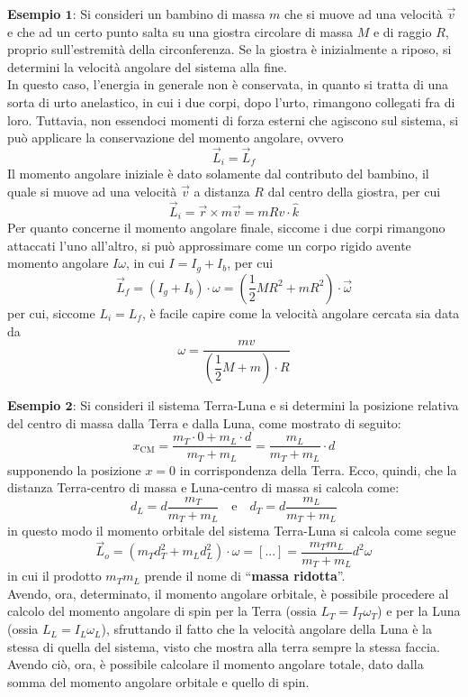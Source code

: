 \documentclass[a4paper]{extarticle}
\newcommand{\quotes}[1]{``#1''}
\begin{document}
\vspace{1em}
\noindent
\textbf{Esempio $\boldsymbol{1}$}: Si consideri un bambino di massa $m$ che si muove ad una velocità $\vec v$ e che ad un certo punto salta su una giostra circolare di massa $M$ e di raggio $R$, proprio sull'estremità della circonferenza. Se la giostra è inizialmente a riposo, si determini la velocità angolare del sistema alla fine.\\
In questo caso, l'energia in generale non è conservata, in quanto si tratta di una sorta di urto anelastico, in cui i due corpi, dopo l'urto, rimangono collegati fra di loro. Tuttavia, non essendoci momenti di forza esterni che agiscono sul sistema, si può applicare la conservazione del momento angolare, ovvero
\[\vec L_i = \vec L_f\]
Il momento angolare iniziale è dato solamente dal contributo del bambino, il quale si muove ad una velocità $\vec v$ a distanza $R$ dal centro della giostra, per cui
\[\vec L_i = \vec r \times m \vec v = m R v \cdot \hat{k}\]
Per quanto concerne il momento angolare finale, siccome i due corpi rimangono attaccati l'uno all'altro, si può approssimare come un corpo rigido avente momento angolare $I \omega$, in cui $I=I_g+I_b$, per cui
\[\vec L_f = (I_g + I_b) \cdot \omega = \left(\frac{1}{2}MR^2 + mR^2\right) \cdot \vec \omega\]
per cui, siccome $L_i=L_f$, è facile capire come la velocità angolare cercata sia data da
\[\omega = \frac{mv}{\left(\dfrac{1}{2}M + m\right) \cdot R}\]

\vspace{1em}
\noindent
\textbf{Esempio $\boldsymbol{2}$}: Si consideri il sistema Terra-Luna e si determini la posizione relativa del centro di massa dalla Terra e dalla Luna, come mostrato di seguito:
\[x_{\text{CM}} = \frac{m_T \cdot 0 + m_L \cdot d}{m_T + m_L} = \frac{m_L}{m_T + m_L} \cdot d\]
supponendo la posizione $x=0$ in corrispondenza della Terra. Ecco, quindi, che la distanza Terra-centro di massa e Luna-centro di massa si calcola come:
\[d_L=d \frac{m_T}{m_T+m_L} \hspace{1em} \text{e} \hspace{1em} d_T=d \frac{m_L}{m_T+m_L}\]
in questo modo il momento orbitale del sistema Terra-Luna si calcola come segue
\[\vec L_o = (m_T d_T^2 + m_L d_L^2) \cdot \omega = [...] = \frac{m_T m_L}{m_T+m_L} d^2 \omega\]
in cui il prodotto $m_T m_L$ prende il nome di \quotes{\textbf{massa ridotta}}.\\
Avendo, ora, determinato, il momento angolare orbitale, è possibile procedere al calcolo del momento angolare di spin per la Terra (ossia $L_T = I_T \omega_T$) e per la Luna (ossia $L_L = I_L \omega_L$), sfruttando il fatto che la velocità angolare della Luna è la stessa di quella del sistema, visto che mostra alla terra sempre la stessa faccia. Avendo ciò, ora, è possibile calcolare il momento angolare totale, dato dalla somma del momento angolare orbitale e quello di spin.
\end{document}
